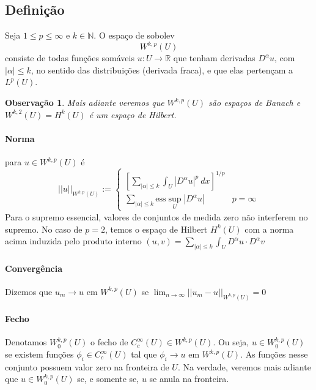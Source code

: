\documentclass[11pt]{article}
\newcommand{\N}{\mathbb{N}}
\newcommand{\R}{\mathbb{R}}
\newtheorem{remark}{Observação}
\begin{document}
\subsection*{Definição}

Seja \( 1\leq p \leq \infty \) e \( k \in \N \). O espaço de sobolev \[ W^{k,p}(U) \] consiste de todas funções somáveis \( u:U\rightarrow\R \) que tenham derivadas \( D^\alpha u \), com \( |\alpha|\leq k \), no sentido das distribuições (derivada fraca), e que elas pertençam a \( L^p(U) \).

\begin{remark}
	Mais adiante veremos que $W^{k,p}(U)$ são espaços de Banach e $ W^{k,2}(U) = H^k(U)$ é um espaço de Hilbert.
\end{remark}
\paragraph{Norma} para \( u \in W^{k,p}(U) \) é \[ ||u||_{W^{k,p}(U)} := \begin{cases}
	\left[ \sum_{|\alpha|\leq k} \int_U \left| D^{\alpha} u\right|^p\ dx  \right]^{1/p}\\
	\sum_{|\alpha|\leq k} \text{ess}\sup_U \left| D^{\alpha} u \right| & p=\infty
\end{cases}\]Para o supremo essencial, valores de conjuntos de medida zero não interferem no supremo. No caso de \( p=2 \), temos o espaço de Hilbert \( H^k(U) \) com a norma acima induzida pelo produto interno \( (u,v) =\sum_{|\alpha|\leq k} \int_U D^{\alpha}u \cdot D^\alpha v   \)

\paragraph{Convergência} Dizemos que \( u_m \rightarrow u\) em \( W^{k,p}(U) \) se \( \lim_{n\rightarrow \infty} ||u_m - u||_{W^{k,p}(U)} =0\)

\paragraph{Fecho} Denotamos \( W^{k,p}_0 (U) \) o fecho de \( C^{\infty}_c(U) \in W^{k,p}(U) \). Ou seja, \( u \in W^{k,p}_0(U) \) se existem funções \( \phi_i \in C^{\infty}_c(U) \) tal que \( \phi_i \rightarrow u \) em \( W^{k,p}(U) \). As funções nesse conjunto possuem valor zero na fronteira de \( U \). Na verdade, veremos mais adiante que $u \in  W^{k,p}_0 (U)$ se, e somente se, $u$ se anula na fronteira.

\end{document}
